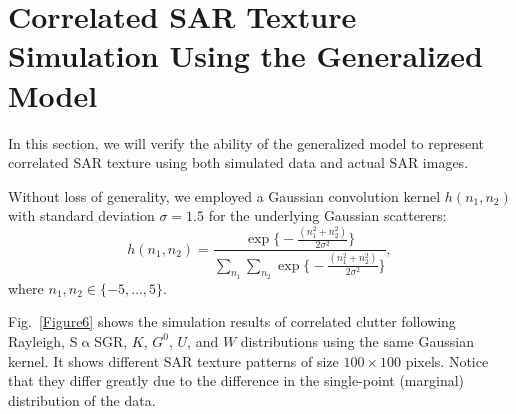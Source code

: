 \documentclass[journal]{IEEEtran}
\begin{document}
\section{Correlated SAR Texture Simulation Using the Generalized Model}\label{Sec:Simulation}

In this section, we will verify the ability of the generalized model to represent correlated SAR texture using both simulated data and actual SAR images.

Without loss of generality, we employed a Gaussian convolution kernel $h(n_1,n_2)$ with standard deviation $\sigma = 1.5$ for the underlying Gaussian scatterers:
\begin{equation}
h\left(n_{1}, n_{2}\right)=\frac{\exp\bigl\{-\frac{(n_{1}^{2}+n_{2}^{2})}{2 \sigma^{2}}\bigr\}}{\sum_{n_{1}} \sum_{n_{2}} \exp\bigl\{-\frac{(n_{1}^{2}+n_{2}^{2})}{2 \sigma^{2}}\bigr\}},
\label{eq43}
\end{equation}
where $n_1,n_2\in\{-5,\dots,5\}$.

Fig.~\ref{Figure6} shows the simulation results of correlated clutter following
Rayleigh,
S$\upalpha$SGR,
$K$,
$G^0$,
$U$,
and $W$ distributions using the same Gaussian kernel.
It shows different SAR texture patterns of size $100\times100$ pixels.
Notice that they differ greatly due to the difference in the single-point (marginal) distribution of the data.
\end{document}
